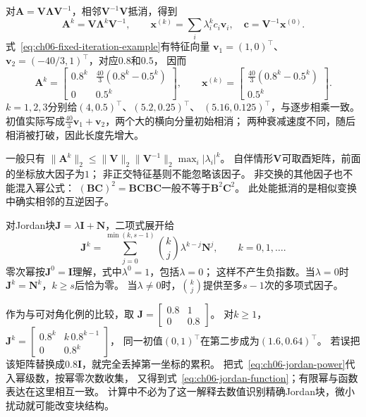 对$\bm A=\bm V\bm\Lambda\bm V^{-1}$，相邻$\bm V^{-1}\bm V$抵消，得到
\[
 \bm A^k=\bm V\bm\Lambda^k\bm V^{-1},\qquad
 \bm x^{(k)}=\sum_i\lambda_i^k c_i\bm v_i,\quad
 \bm c=\bm V^{-1}\bm x^{(0)}.
\]
式~\eqref{eq:ch06-fixed-iteration-example}有特征向量
$\bm v_1=(1,0)^\top$、$\bm v_2=(-40/3,1)^\top$，对应$0.8$和$0.5$，
因而
\begin{equation}
 \bm A^k=
 \begin{bmatrix}
  0.8^k&\frac{40}{3}(0.8^k-0.5^k)\\
  0&0.5^k
 \end{bmatrix},\qquad
 \bm x^{(k)}=
 \begin{bmatrix}\frac{40}{3}(0.8^k-0.5^k)\\0.5^k\end{bmatrix}.
 \label{eq:ch06-diagonalizable-finite-trajectory}
\end{equation}
$k=1,2,3$分别给$(4,0.5)^\top$、$(5.2,0.25)^\top$、
$(5.16,0.125)^\top$，与逐步相乘一致。
初值实际写成$\tfrac{40}{3}\bm v_1+\bm v_2$，两个大的横向分量初始相消；
两种衰减速度不同，随后相消被打破，因此长度先增大。

一般只有
$\lVert\bm A^k\rVert_2\leq
\lVert\bm V\rVert_2\lVert\bm V^{-1}\rVert_2\max_i|\lambda_i|^k$。
自伴情形$\bm V$可取酉矩阵，前面的坐标放大因子为$1$；
非正交特征基则不能忽略该因子。
非交换的其他因子也不能混入幂公式：
$(\bm B\bm C)^2=\bm B\bm C\bm B\bm C$一般不等于$\bm B^2\bm C^2$。
此处能抵消的是相似变换中确实相邻的互逆因子。


对Jordan块$\bm J=\lambda\bm I+\bm N$，二项式展开给
\begin{equation}
 \bm J^k=\sum_{j=0}^{\min(k,s-1)}
       \binom{k}{j}\lambda^{k-j}\bm N^j,\qquad k=0,1,\ldots.
 \label{eq:ch06-jordan-power}
\end{equation}
零次幂按$\bm J^0=\bm I$理解，式中$\lambda^0=1$，包括$\lambda=0$；
这样不产生负指数。当$\lambda=0$时$\bm J^k=\bm N^k$，$k\geq s$后恰为零。
当$\lambda\neq0$时，$\binom{k}{j}$提供至多$s-1$次的多项式因子。

作为与可对角化例的比较，取
$\bm J=\left[\begin{smallmatrix}0.8&1\\0&0.8\end{smallmatrix}\right]$。
对$k\geq1$，
$\bm J^k=\left[\begin{smallmatrix}0.8^k&k\,0.8^{k-1}\\0&0.8^k\end{smallmatrix}\right]$，
同一初值$(0,1)^\top$在第二步成为$(1.6,0.64)^\top$。
若误把该矩阵替换成$0.8\bm I$，就完全丢掉第一坐标的累积。
把式~\eqref{eq:ch06-jordan-power}代入幂级数，按幂零次数收集，
又得到式~\eqref{eq:ch06-jordan-function}；有限幂与函数表达在这里相互一致。
计算中不必为了这一解释去数值识别精确Jordan块，微小扰动就可能改变块结构。

